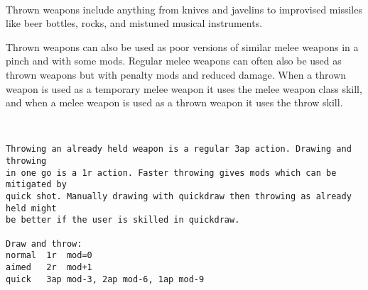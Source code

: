 \

\noindent Thrown weapons include anything from knives and javelins to improvised missiles like beer bottles, rocks, and mistuned musical instruments.

Thrown weapons can also be used as poor versions of similar melee weapons in a pinch and with some mods. Regular melee weapons can often also be used as thrown weapons but with penalty mods and reduced damage. When a thrown weapon is used as a temporary melee weapon it uses the melee weapon class skill, and when a melee weapon is used as a thrown weapon it uses the throw skill.

\

\goodbreak \small \begin{samepage} \begin{verbatim}
Throwing an already held weapon is a regular 3ap action. Drawing and throwing
in one go is a 1r action. Faster throwing gives mods which can be mitigated by
quick shot. Manually drawing with quickdraw then throwing as already held might
be better if the user is skilled in quickdraw.

Draw and throw:
normal  1r  mod=0
aimed   2r  mod+1
quick   3ap mod-3, 2ap mod-6, 1ap mod-9


\end{verbatim}
\end{samepage}
